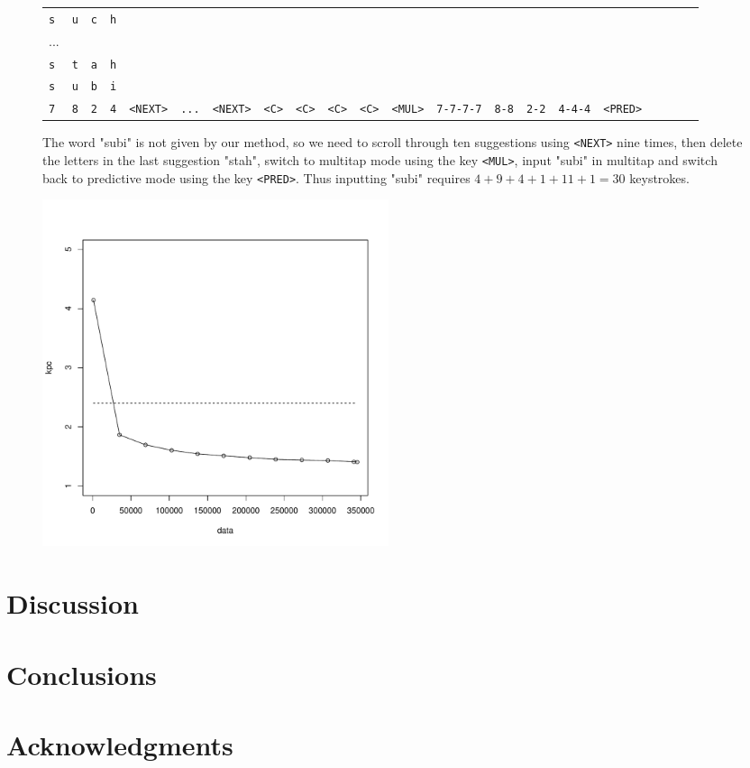 \documentclass{llncs}
\begin{document}
\begin{figure}[htb!]
\begin{center}
\begin{tabular}{lllllllllllllllllllll}
\texttt{s} & \texttt{u} & \texttt{c} & \texttt{h}\\
...\\
\texttt{s} & \texttt{t} & \texttt{a} & \texttt{h}\\
\texttt{s} & \texttt{u} & \texttt{b} & \texttt{i}\\    
\texttt{7} & \texttt{8} & \texttt{2} & \texttt{4} & \texttt{<NEXT>} & \texttt{...} & \texttt{<NEXT>} & \texttt{<C>} & \texttt{<C>} & \texttt{<C>} & \texttt{<C>} & \texttt{<MUL>} & \texttt{7-7-7-7} & \texttt{8-8} & \texttt{2-2} & \texttt{4-4-4} & \texttt{<PRED>}
\end{tabular}

\caption{The word "subi" is not given by our method, so we need to scroll through ten suggestions using \texttt{<NEXT>} nine times, then delete the letters in the last suggestion "stah", switch to multitap mode using the key \texttt{<MUL>}, input "subi" in multitap and switch back to predictive mode using the key \texttt{<PRED>}. Thus inputting "subi" requires $4 + 9 + 4 + 1 + 11 + 1 = 30$ keystrokes.} \label{new-method-kpc-unknown}
\end{center}
\end{figure}



\begin{figure}[hbt!]
\includegraphics[width=4in]{finnish_kpc_figure.pdf}
\end{figure}

\section{Discussion}

\section{Conclusions}

\section{Acknowledgments}



\end{document}
